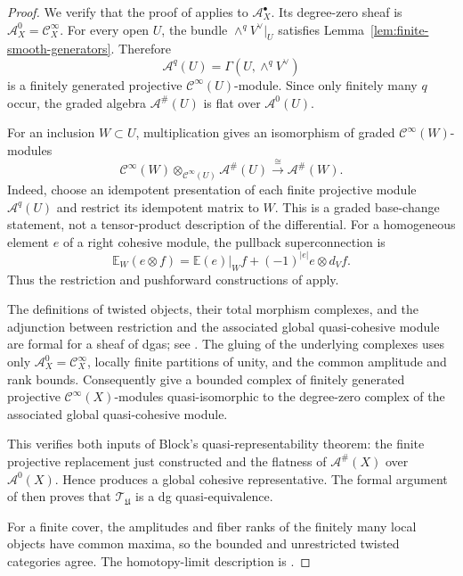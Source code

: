 \documentclass[12pt]{amsart}
\theoremstyle{definition}
\theoremstyle{remark}
\numberwithin{equation}{section}
\newcommand{\CA}{\mathcal A}
\newcommand{\cinf}{\mathcal C^\infty}
\begin{document}
\begin{proof}
We verify that the proof of \cite[Theorem~5.5]{Wei2023} applies to
\(\CA_X^\bullet\).  Its degree-zero sheaf is \(\CA_X^0=\cinf_X\).
For every open \(U\), the bundle
\(\wedge^qV^\vee|_U\) satisfies
Lemma~\ref{lem:finite-smooth-generators}.  Therefore
\[
\CA^q(U)=\Gamma(U,\wedge^qV^\vee)
\]
is a finitely generated projective \(\cinf(U)\)-module.  Since only finitely
many \(q\) occur, the graded algebra \(\CA^\#(U)\) is flat over
\(\CA^0(U)\).

For an inclusion \(W\subset U\), multiplication gives an isomorphism of
graded \(\cinf(W)\)-modules
\[
\cinf(W)\otimes_{\cinf(U)}\CA^\#(U)
\xrightarrow{\ \cong\ }
\CA^\#(W).
\]
Indeed, choose an idempotent presentation of each finite projective module
\(\CA^q(U)\) and restrict its idempotent matrix to \(W\).  This is a graded
base-change statement, not a tensor-product description of the
differential.  For a homogeneous element \(e\) of a right cohesive module,
the pullback superconnection is
\[
\mathbb E_W(e\otimes f)
=
\mathbb E(e)|_W f+(-1)^{|e|}e\otimes d_Vf.
\]
Thus the restriction and pushforward constructions of
\cite[Section~2.2 and Proposition~2.8]{Wei2023} apply.

The definitions of twisted objects, their total morphism complexes, and the
adjunction between restriction and the associated global quasi-cohesive
module are formal for a sheaf of dgas; see
\cite[Sections~3.1--3.4]{Wei2023}.  The gluing of the underlying complexes
uses only \(\CA_X^0=\cinf_X\), locally finite partitions of unity, and the
common amplitude and rank bounds.  Consequently
\cite[Propositions~4.2 and 4.3]{Wei2023} give a bounded complex of finitely
generated projective \(\cinf(X)\)-modules quasi-isomorphic to the
degree-zero complex of the associated global quasi-cohesive module.

This verifies both inputs of Block's quasi-representability theorem: the
finite projective replacement just constructed and the flatness of
\(\CA^\#(X)\) over \(\CA^0(X)\).  Hence
\cite[Theorem~3.13]{Block2010} produces a global cohesive representative.
The formal argument of \cite[Propositions~5.2 and 5.3, Lemma~5.4]{Wei2023}
then proves that \(\mathcal T_{\mathfrak U}\) is a dg quasi-equivalence.

For a finite cover, the amplitudes and fiber ranks of the finitely many local
objects have common maxima, so the bounded and unrestricted twisted
categories agree.  The homotopy-limit description is
\cite[Theorem~3.1]{Wei2023}.
\end{proof}
\end{document}
